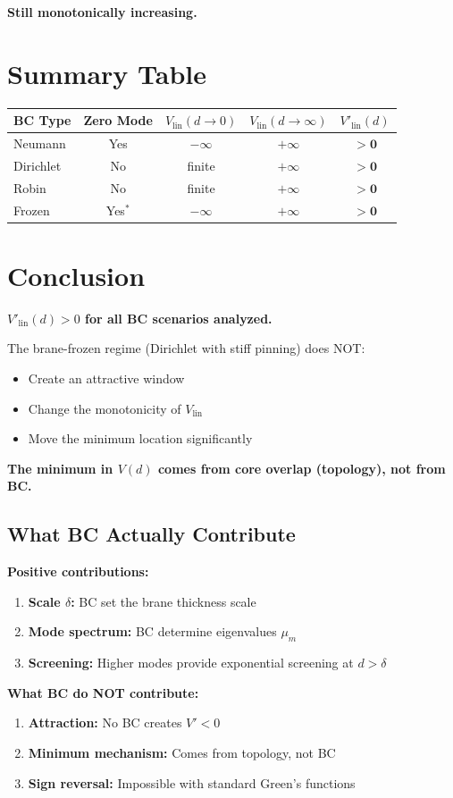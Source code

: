 \documentclass[11pt,a4paper]{article}
\begin{document}
\textbf{Still monotonically increasing.}

\section{Summary Table}
\label{sec:bc-sign-summary}

\begin{center}
\begin{tabular}{@{}lcccc@{}}
\toprule
BC Type & Zero Mode & $V_{\mathrm{lin}}(d \to 0)$ & $V_{\mathrm{lin}}(d \to \infty)$ & $V'_{\mathrm{lin}}(d)$ \\
\midrule
Neumann & Yes & $-\infty$ & $+\infty$ & $\mathbf{>0}$ \\
Dirichlet & No & finite & $+\infty$ & $\mathbf{>0}$ \\
Robin & No & finite & $+\infty$ & $\mathbf{>0}$ \\
Frozen & Yes$^*$ & $-\infty$ & $+\infty$ & $\mathbf{>0}$ \\
\bottomrule
\end{tabular}
\end{center}

\section{Conclusion}

\textbf{$V'_{\mathrm{lin}}(d) > 0$ for all BC scenarios analyzed.}

The brane-frozen regime (Dirichlet with stiff pinning) does NOT:
\begin{itemize}
    \item Create an attractive window
    \item Change the monotonicity of $V_{\mathrm{lin}}$
    \item Move the minimum location significantly
\end{itemize}

\textbf{The minimum in $V(d)$ comes from core overlap (topology), not from BC.}

\subsection{What BC Actually Contribute}

\textbf{Positive contributions:}
\begin{enumerate}
    \item \textbf{Scale $\delta$:} BC set the brane thickness scale
    \item \textbf{Mode spectrum:} BC determine eigenvalues $\mu_m$
    \item \textbf{Screening:} Higher modes provide exponential screening at $d > \delta$
\end{enumerate}

\textbf{What BC do NOT contribute:}
\begin{enumerate}
    \item \textbf{Attraction:} No BC creates $V' < 0$
    \item \textbf{Minimum mechanism:} Comes from topology, not BC
    \item \textbf{Sign reversal:} Impossible with standard Green's functions
\end{enumerate}
\end{document}
